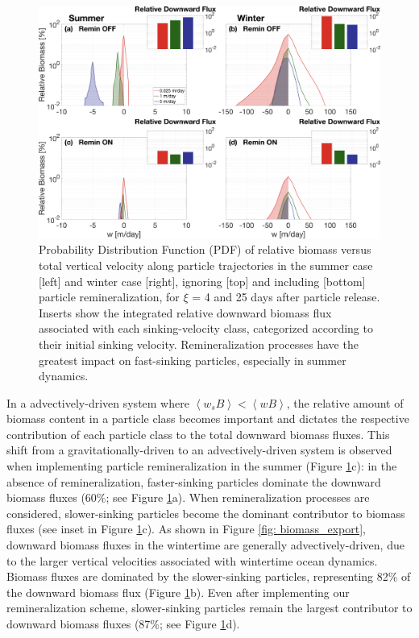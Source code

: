 \documentclass[article,linenumbers]{agujournal2018}
\begin{document}
	\begin{figure}[t!]
		\centering
		\includegraphics[width = 1\linewidth]{Fig8.png}
		\caption{Probability Distribution Function (PDF) of relative biomass versus total vertical velocity  along particle trajectories in the summer case [left] and winter case [right], ignoring [top] and including [bottom] particle remineralization, for $\xi$ = 4 and 25 days after particle release. Inserts show the integrated relative downward biomass flux associated with each sinking-velocity class, categorized according to their initial sinking velocity. Remineralization processes have the greatest impact on fast-sinking particles, especially in summer dynamics.}	
		\label{fig: biomass_export_remin}
	\end{figure}
	In a advectively-driven system where $\left<w_sB\right> < \left<wB\right>$, the relative amount of biomass content in a particle class becomes important and dictates the respective contribution of each particle class to the total downward biomass fluxes. This shift from a gravitationally-driven to an advectively-driven system is observed when implementing particle remineralization in the summer (Figure \ref{fig: biomass_export_remin}c): in the absence of remineralization, faster-sinking particles dominate the downward biomass fluxes (60\%; see Figure \ref{fig: biomass_export_remin}a). When remineralization processes are considered, slower-sinking particles become the dominant contributor to biomass fluxes (see inset in Figure \ref{fig: biomass_export_remin}c). As shown in Figure \ref{fig: biomass_export}, downward biomass fluxes in the wintertime are generally advectively-driven, due to the larger vertical velocities associated with wintertime ocean dynamics. Biomass fluxes are dominated by the slower-sinking particles, representing 82\% of the downward biomass flux (Figure \ref{fig: biomass_export_remin}b). Even after implementing our remineralization scheme, slower-sinking particles remain the largest contributor to downward biomass fluxes (87\%; see Figure \ref{fig: biomass_export_remin}d).
	
\end{document}
